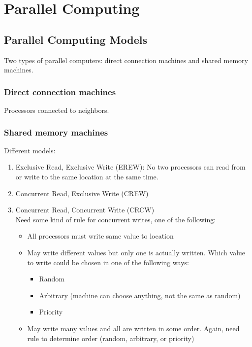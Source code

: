 \section{Parallel Computing}

\subsection{Parallel Computing Models}

Two types of parallel computers: direct connection machines and shared memory machines.

\subsubsection*{Direct connection machines}

Processors connected to neighbors.

\subsubsection*{Shared memory machines}

Different models:
\begin{enumerate}
    \item Exclusive Read, Exclusive Write (EREW): No two processors can read from or write to the same location at the same time.
    \item Concurrent Read, Exclusive Write (CREW)
    \item Concurrent Read, Concurrent Write (CRCW)\\
        Need some kind of rule for concurrent writes, one of the following:
        \begin{itemize}
            \item All processors must write same value to location
            \item May write different values but only one is actually written.
                Which value to write could be chosen in one of the following ways:
                \begin{itemize}
                    \item Random
                    \item Arbitrary (machine can choose anything, not the same as random)
                    \item Priority
                \end{itemize}
            \item May write many values and all are written in some order. Again, need rule to determine order (random, arbitrary, or priority)
        \end{itemize}
\end{enumerate}

